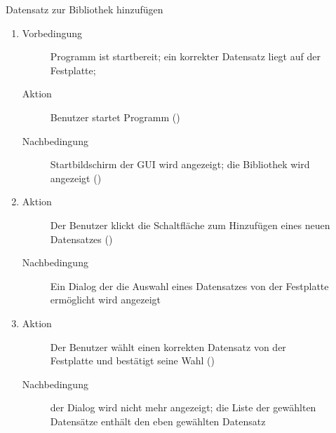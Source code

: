 \begin{description}
	\item[] Datensatz zur Bibliothek hinzufügen
	\begin{enumerate}
		\item
		\begin{description}
			\item[Vorbedingung] Programm ist startbereit; ein korrekter Datensatz liegt auf der Festplatte; %
			\item[Aktion] Benutzer startet Programm ()
			\item[Nachbedingung] Startbildschirm der GUI wird angezeigt; die Bibliothek wird angezeigt ()
		\end{description}
		\item
		\begin{description}
			\item[Aktion] Der Benutzer klickt die Schaltfläche zum Hinzufügen eines neuen Datensatzes ()
			\item[Nachbedingung] Ein Dialog der die Auswahl eines Datensatzes von der Festplatte ermöglicht wird angezeigt
		\end{description}
		\item
		\begin{description}
			\item[Aktion] Der Benutzer wählt einen korrekten Datensatz von der Festplatte und bestätigt seine Wahl ()
			\item[Nachbedingung] der Dialog wird nicht mehr angezeigt; die Liste der gewählten Datensätze enthält den eben gewählten Datensatz
		\end{description}
	\end{enumerate}


\end{description}
